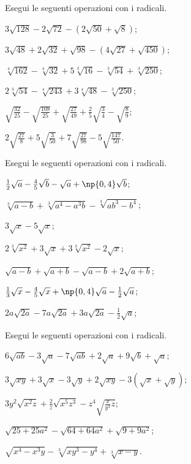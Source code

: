 \begin{esercizio}[\Ast]
 \label{ese:2.65}
Esegui le seguenti operazioni con i radicali.
 \begin{multicols}{2}
 \begin{enumeratea}
 \item $3\sqrt{128}-2\sqrt{72}-(2\sqrt{50}+\sqrt 8)$;
 \item $3\sqrt{48}+2\sqrt{32}+\sqrt{98}-(4\sqrt{27}+\sqrt{450})$;
 \item $\sqrt[4]{162}-\sqrt[4]{32}+5\sqrt[3]{16}-\sqrt[3]{54}+\sqrt[3]{250}$;
 \item $2\sqrt[3]{54}-\sqrt[4]{243}+3\sqrt[4]{48}-\sqrt[3]{250}$;
 \item $\sqrt{\frac{32}{25}}-\sqrt{\frac{108}{25}}+\sqrt{\frac{27}{49}}+\frac 2 5\sqrt{\frac 3 4}-\sqrt{\frac 8 9}$;
 \item $2\sqrt{\frac{27} 8}+5\sqrt{\frac 3{50}}+7\sqrt{\frac{27}{98}}-5\sqrt{\frac{147}{50}}$.
 \end{enumeratea}
 \end{multicols}
\end{esercizio}

\begin{esercizio}[\Ast]
 \label{ese:2.66}
Esegui le seguenti operazioni con i radicali.
 \begin{multicols}{2}
 \begin{enumeratea}
 \item $\frac 1 2\sqrt a-\frac 4 5\sqrt b-\sqrt a+\np{0,4}\sqrt b$;
 \item $\sqrt[3]{a-b}+\sqrt[3]{a^4-a^3b}-\sqrt[3]{{ab}^3-b^4}$;
 \item $3\sqrt x-5\sqrt x$;
 \item $2\sqrt[3]{x^2}+3\sqrt x+3\sqrt[3]{x^2}-2\sqrt x$;
 \item $\sqrt{a-b}+\sqrt{a+b}-\sqrt{a-b}+2\sqrt{a+b}$;
 \item $\frac 1 3\sqrt x-\frac 4 5\sqrt x+\np{0,4}\sqrt a-\frac 1 2\sqrt a$;
 \item $2a\sqrt{2a}-7a\sqrt{2a}+3a\sqrt{2a}-\frac 1 2\sqrt a$;
 \end{enumeratea}
 \end{multicols}
\end{esercizio}

\begin{esercizio}[\Ast]
 \label{ese:2.67}
Esegui le seguenti operazioni con i radicali.
 \begin{enumeratea}
 \item $6\sqrt{{ab}}-3\sqrt a-7\sqrt{{ab}}+2\sqrt a+9\sqrt b+\sqrt a$;
 \item $3\sqrt{xy}+3\sqrt x-3\sqrt y+2\sqrt{xy}-3(\sqrt x+\sqrt y)$;
 \item $3y^{2}\sqrt{x^{2}z}+\frac{2}{z}\sqrt{x^{5}z^{3}}-z^{4}\sqrt{\frac{x}{y^{2}}z}$;
 \item $\sqrt{25+25a^{2}}-\sqrt{64+64a^{2}}+\sqrt{9+9a^{2}}$;
 \item $\sqrt{x^{4}-x^{3}y}-\sqrt[3]{xy^{3}-y^{4}}+\sqrt[3]{x-y}$.
 \end{enumeratea}
\end{esercizio}

